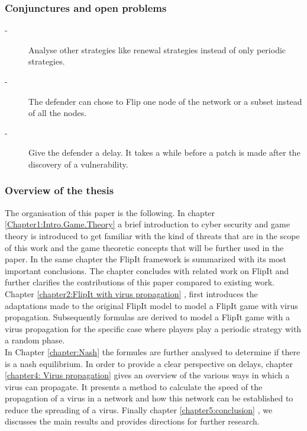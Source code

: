 \subsubsection{Conjunctures and open problems}

\begin{description}
\item[-] Analyse other strategies like renewal strategies instead of only periodic strategies.
\item[-] The defender can chose to Flip one node of the network or a subset instead of all the nodes.
\item[-] Give the defender a delay. It takes a while before a patch is made after the discovery of a vulnerability.
\end{description}

\subsubsection{Overview of the thesis}

The organisation of this paper is the following.  In chapter \ref{Chapter1:Intro.Game.Theory}  a brief introduction to cyber security and game theory is introduced to get familiar with the kind of threats that are in the scope of this work and the game theoretic concepts that will be further used in the paper. In the same chapter the FlipIt framework is summarized with its most important conclusions. The chapter concludes with related work on FlipIt and further clarifies the contributions of this paper compared to existing work. 
Chapter \ref{chapter2:FlipIt with virus propagation} , first introduces the adaptations made to the original FlipIt model to model a FlipIt game with virus propagation. Subsequently formulas are derived to model a FlipIt game with a virus propagation for the specific case where players play a periodic strategy with a random phase. \\
In Chapter \ref{chapter:Nash} the formules are further analysed to determine if there is a nash equilibrium. 
In order to provide a clear perspective on delays, chapter \ref{chapter4: Virus propagation} gives an overview of the various ways in which a virus can propagate. It presents a method to calculate the speed of the propagation of a virus in a network and how this network can be established to reduce the spreading of a virus.
Finally chapter \ref{chapter5:conclusion} , we discusses the main results and provides directions for further research.

